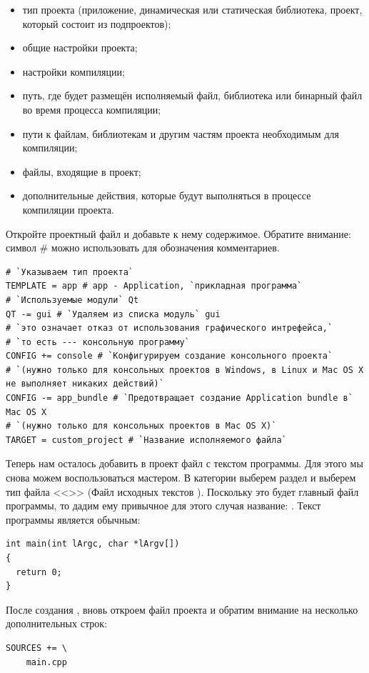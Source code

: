 \begin{itemize}
\item тип проекта (приложение, динамическая или статическая библиотека, проект, который состоит из
подпроектов);
\item общие настройки проекта;
\item настройки компиляции;
\item путь, где будет размещён исполняемый файл, библиотека или бинарный
файл во время процесса компиляции;
\item пути к файлам, библиотекам и другим
частям проекта необходимым для компиляции;
\item файлы, входящие в проект;
\item дополнительные действия, которые будут выполняться в процессе компиляции проекта.
\end{itemize}

Откройте проектный файл и добавьте к нему содержимое. Обратите внимание: символ \#
можно использовать для обозначения комментариев.
\begin{lstlisting}
# `Указываем тип проекта`
TEMPLATE = app # app - Application, `прикладная программа`
# `Используемые модули` Qt 
QT -= gui # `Удаляем из списка модуль` gui
# `это означает отказ от использования графического интрефейса,`
# `то есть --- консольную программу`
CONFIG += console # `Конфигурируем создание консольного проекта`
# `(нужно только для консольных проектов в Windows, в Linux и Mac OS X не выполняет никаких действий)`
CONFIG -= app_bundle # `Предотвращает создание Application bundle в` Mac OS X
# `(нужно только для консольных проектов в Mac OS X)`
TARGET = custom_project # `Название исполняемого файла`
\end{lstlisting}

Теперь нам осталось добавить в проект
файл с текстом программы. Для этого мы снова можем воспользоваться мастером. 
В категории  выберем раздел  и выберем тип файла
<<>> (Файл исходных текстов ).
Поскольку это будет главный файл программы, то дадим ему привычное для
этого случая название: . Текст программы является обычным:
\begin{lstlisting}
int main(int lArgc, char *lArgv[])
{
  return 0;
}
\end{lstlisting}

После создания , вновь откроем файл проекта и обратим внимание на несколько дополнительных строк:
\begin{lstlisting}
SOURCES += \
    main.cpp
\end{lstlisting}

